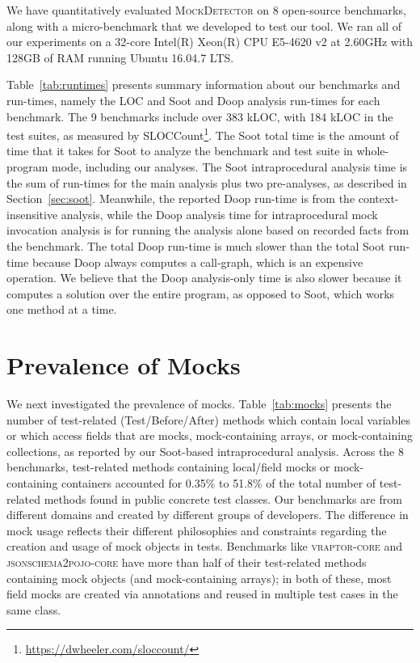 We have quantitatively evaluated \textsc{MockDetector} on 8 open-source benchmarks, along with a micro-benchmark that we developed to test our tool. We ran all of our experiments on a 32-core Intel(R) Xeon(R) CPU E5-4620 v2 at 2.60GHz with 128GB of RAM running Ubuntu 16.04.7 LTS.

Table~\ref{tab:runtimes} presents summary information about our benchmarks and run-times, namely the LOC and Soot and Doop analysis run-times for each benchmark. The 9 benchmarks include over 383 kLOC, with 184 kLOC in the test suites, as measured by SLOCCount\footnote{\url{https://dwheeler.com/sloccount/}}. The Soot total time is the amount of time that it takes for Soot to analyze the benchmark and test suite in whole-program mode, including our analyses. The Soot intraprocedural analysis time is the sum of run-times for the main analysis plus two pre-analyses, as described in Section~\ref{sec:soot}. Meanwhile, the reported Doop run-time is from the context-insensitive analysis, while the Doop analysis time for intraprocedural mock invocation analysis is for running the analysis alone based on recorded facts from the benchmark. The total Doop run-time is much slower than the total Soot run-time because Doop always computes a call-graph, which is an expensive operation. We believe that the Doop analysis-only time is also slower because it computes a solution over the entire program, as opposed to Soot, which works one method at a time.

\section{Prevalence of Mocks}

We next investigated the prevalence of mocks. Table~\ref{tab:mocks} presents the number of test-related (Test/Before/After) methods which contain local variables or which access fields that are mocks, mock-containing arrays, or mock-containing collections, as reported by our Soot-based intraprocedural analysis. Across the 8 benchmarks, test-related methods containing local/field mocks or mock-containing containers accounted for 0.35\% to 51.8\% of the total number of test-related methods found in public concrete test classes. Our benchmarks are from different domains and created by different groups of developers. The difference in mock usage reflects their different philosophies and constraints regarding the creation and usage of mock objects in tests. Benchmarks like \textsc{vraptor-core} and \textsc{jsonschema2pojo-core} have more than half of their test-related methods containing mock objects (and mock-containing arrays); in both of these, most field mocks are created via annotations and reused in multiple test cases in the same class.


